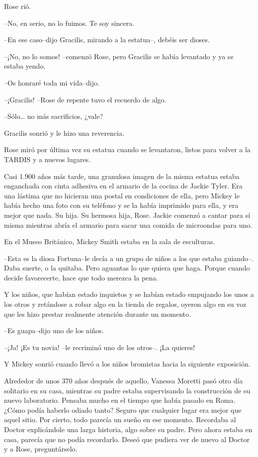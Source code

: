 Rose rió.

--No, en serio, no lo fuimos. Te soy sincera.

--En ese caso--dijo Gracilis, mirando a la estatua--, debéis ser dioses.

--¡No, no lo somos! --comenzó Rose, pero Gracilis se había levantado y
ya se estaba yendo.

--Os honraré toda mi vida--dijo.

--¡Gracilis! --Rose de repente tuvo el recuerdo de algo.

--Sólo\ldots{} no más sacrificios, ¿vale?

Gracilis sonrió y le hizo una reverencia.

Rose miró por última vez su estatua cuando se levantaron, listos para
volver a la TARDIS y a nuevos lugares.

Casi 1.900 años más tarde, una granulosa imagen de la misma estatua
estaba enganchada con cinta adhesiva en el armario de la cocina de
Jackie Tyler. Era una lástima que no hicieran una postal en condiciones
de ella, pero Mickey le había hecho una foto con su teléfono y se la
había imprimido para ella, y era mejor que nada. Su hija. Su hermosa
hija, Rose. Jackie comenzó a cantar para sí misma mientras abría el
armario para sacar una comida de microondas para uno.

En el Museo Británico, Mickey Smith estaba en la sala de esculturas.

--Esta es la diosa Fortuna--le decía a un grupo de niños a los que
estaba guiando--. Daba suerte, o la quitaba. Pero aguantas lo que quiera
que haga. Porque cuando decide favorecerte, hace que todo merezca la
pena.

Y los niños, que habían estado inquietos y se habían estado empujando
los unos a los otros y retándose a robar algo en la tienda de regalos,
oyeron algo en su voz que les hizo prestar realmente atención durante un
momento.

--Es guapa--dijo uno de los niños.

--¡Ja! ¡Es tu novia! --le recriminó uno de los otros--. ¡La quieres!

Y Mickey sonrió cuando llevó a los niños bromistas hacia la siguiente
exposición.

Alrededor de unos 370 años después de aquello, Vanessa Moretti pasó otro
día solitario en su casa, mientras su padre estaba supervisando la
construcción de su nuevo laboratorio. Pensaba mucho en el tiempo que
había pasado en Roma. ¿Cómo podía haberlo odiado tanto? Seguro que
cualquier lugar era mejor que aquel sitio. Por cierto, todo parecía un
sueño en ese momento. Recordaba al Doctor explicándole una larga
historia, algo sobre su padre. Pero ahora estaba en casa, parecía que no
podía recordarlo. Deseó que pudiera ver de nuevo al Doctor y a Rose,
preguntárselo.

